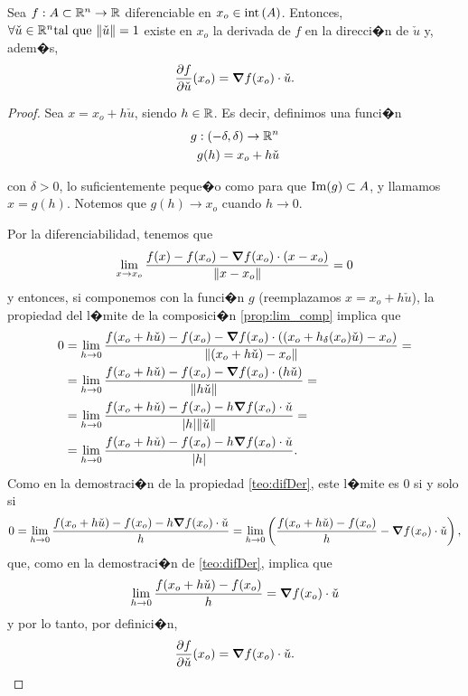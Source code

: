 \documentclass[a4paper]{scrartcl} %
\begin{document}
\begin{theorem}\label{teo:difDir}
\mbox{}

Sea $f: A \subset \mathbb{R}^n \to \mathbb{R}$ diferenciable en $x_o \in \operatorname{int}{(A)}$. Entonces, $\forall \check{u} \in \mathbb{R}^n \text{tal que } \norm{\check{u}} = 1$ existe en $x_o$ la derivada de $f$ en la direcci�n de $\check{u}$ y, adem�s,
\[
 \frac{\partial f}{\partial \check{u}} (x_o) = \grad f (x_o) \cdot \check{u}.
\]

 \begin{proof}
 \mbox{}
 
 Sea $x = x_o + h \check{u}$, siendo $h \in \mathbb{R}$. Es decir, definimos una funci�n 
 \begin{align*}
      g & :(-\delta,\delta) \to \mathbb{R}^n \\
        & g(h) = x_o + h \check{u}
 \end{align*}

con $\delta > 0$, lo suficientemente peque�o como para que $\operatorname{Im}(g) \subset A$, y llamamos $x = g(h)$. Notemos que $g(h) \to x_o$ cuando $h \to 0$. 

Por la diferenciabilidad, tenemos que 
\[
 \lim_{x \to x_o} \frac{f(x) - f(x_o) - \grad f (x_o) \cdot (x - x_o)}
                                 {\norm{x - x_o}} = 0
\]
y entonces, si componemos con la funci�n $g$ (reemplazamos $x = x_o + h \check{u}$), la propiedad del l�mite de la composici�n \eqref{prop:lim_comp} implica que
\begin{align*}
  0 & = \lim_{h \to 0} \frac{f(x_o + h \check{u}) - f(x_o) - \grad f (x_o) \cdot ((x_o + h _{\delta}(x_o)\check{u}) - x_o) }
                    {\norm{(x_o + h \check{u}) - x_o}} = \\
    & = \lim_{h \to 0} \frac{f(x_o + h \check{u}) - f(x_o) - \grad f (x_o) \cdot (h \check{u}) }
                    {\norm{h \check{u}}} = \\
    & = \lim_{h \to 0} \frac{f(x_o + h \check{u}) - f(x_o) - h \grad f (x_o) \cdot \check{u} }
                    {\abs{h} \norm{\check{u}}} = \\
    & = \lim_{h \to 0} \frac{f(x_o + h \check{u}) - f(x_o) - h \grad f (x_o) \cdot \check{u} }
                    {\abs{h}}.  
\end{align*}                                
Como en la demostraci�n de la propiedad \eqref{teo:difDer}, este l�mite es $0$ si y solo si
\[
 0 = \lim_{h \to 0} \frac{f(x_o + h \check{u}) - f(x_o) - h \grad f (x_o) \cdot \check{u}}{h} = 
     \lim_{h \to 0} \left( \frac{f(x_o + h \check{u}) - f(x_o)}{h} - \grad f (x_o) \cdot \check{u} \right),
\]
que, como en la demostraci�n de \eqref{teo:difDer}, implica que 
\[
 \lim_{h \to 0} \frac{f(x_o + h \check{u}) - f(x_o)}{h} = \grad f (x_o) \cdot \check{u}
\]
y por lo tanto, por definici�n,
\[
 \frac{\partial f}{\partial \check{u}} (x_o) = \grad f (x_o) \cdot \check{u}.
\]
 \end{proof}
\end{theorem}
\end{document}

